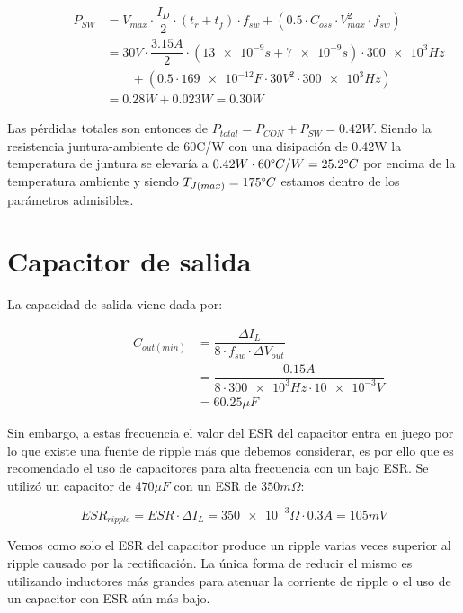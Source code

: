 \documentclass[12pt]{report}
\begin{document}
	\begin{equation}
		\begin{aligned}
		\qquad \qquad P_{SW} &= V_{max} \cdot \dfrac{I_D}{2} \cdot (t_r + t_f) \cdot f_{sw} + (0.5 \cdot C_{oss} \cdot V_{max}^2 \cdot f_{sw})\\
		& = 30V \cdot \dfrac{3.15A}{2} \cdot (\num{13e-9}s + \num{7e-9}s) \cdot \num{300e3}Hz \\
		& \qquad + (0.5 \cdot \num{169e-12}F \cdot 30V^2 \cdot \num{300e3}Hz)\\
		& = 0.28W + 0.023W = 0.30W
		\end{aligned}
	\end{equation}
	
	Las pérdidas totales son entonces de $P_{total} = P_{CON} + P_{SW} = 0.42W$. Siendo la resistencia juntura-ambiente de 60\textdegree C/W con una disipación de 0.42W la temperatura de juntura se elevaría a $0.42W \cdot 60\degree C/W = 25.2\degree C$ por encima de la temperatura ambiente y siendo $T_{J(max)} = 175\degree C$ estamos dentro de los parámetros admisibles.

\section{Capacitor de salida}

	La capacidad de salida viene dada por:

	\begin{equation}
		\begin{aligned}
		\qquad \qquad C_{out(min)} &= \dfrac{\Delta I_L}{8 \cdot f_{sw} \cdot \Delta V_{out}} \\
		& = \dfrac{0.15A}{8 \cdot \num{300e3}Hz \cdot \num{10e-3}V} \\
		& = 60.25 \mu F
		\end{aligned}
	\end{equation}

	Sin embargo, a estas frecuencia el valor del ESR del capacitor entra en juego por lo que existe una fuente de ripple más que debemos considerar, es por ello que es recomendado el uso de capacitores para alta frecuencia con un bajo ESR. Se utilizó un capacitor de $470 \mu F$ con un ESR de $350 m \Omega$:
	
	\begin{equation}
		ESR_{ripple} = ESR \cdot \Delta I_L = \num{350e-3}\Omega \cdot 0.3A = 105mV
	\end{equation}
	
	Vemos como solo el ESR del capacitor produce un ripple varias veces superior al ripple causado por la rectificación. La única forma de reducir el mismo es utilizando inductores más grandes para atenuar la corriente de ripple o el uso de un capacitor con ESR aún más bajo.
	
\end{document}
